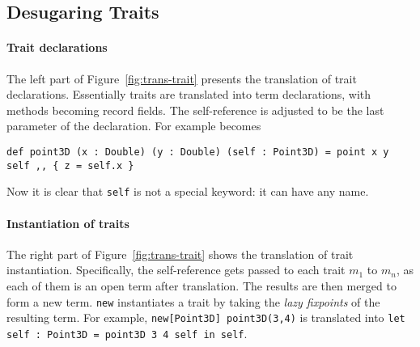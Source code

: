 \subsection{Desugaring Traits}

\paragraph{Trait declarations}

The left part of Figure~\ref{fig:trans-trait} presents the translation of trait
declarations. Essentially traits are translated into term declarations, with
methods becoming record fields. The self-reference is adjusted to be the last
parameter of the declaration. For example
becomes
\begin{lstlisting}
def point3D (x : Double) (y : Double) (self : Point3D) = point x y self ,, { z = self.x }
\end{lstlisting}
Now it is clear that \lstinline{self} is not a special keyword: it can have any
name.



\paragraph{Instantiation of traits}

The right part of Figure~\ref{fig:trans-trait} shows the translation of trait
instantiation. Specifically, the self-reference gets passed to each trait $m_1$
to $m_n$, as each of them is an open term after translation. The results are
then merged to form a new term. \lstinline{new} instantiates a trait by
taking the \textit{lazy fixpoints} of the resulting term. For example,
\lstinline{new[Point3D] point3D(3,4)} is translated into \lstinline{let self : Point3D = point3D 3 4 self in self}.




